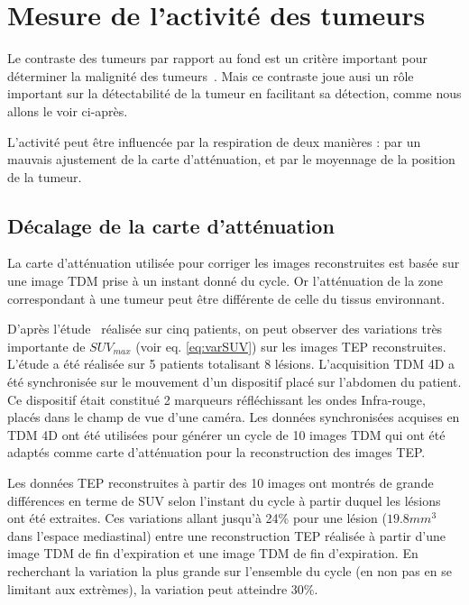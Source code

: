 \section{Mesure de l'activité des tumeurs}

Le contraste des tumeurs par rapport au fond est un critère important pour déterminer la malignité des tumeurs~\cite{dimitrakopoulou2002role, krak2005effects}. Mais ce contraste joue ausi un rôle important sur la détectabilité de la tumeur en facilitant sa détection, comme nous allons le voir ci-après.

L'activité peut être influencée par la respiration de deux manières : par un mauvais ajustement de la carte d'atténuation, et par le moyennage de la position de la tumeur.

\subsection{Décalage de la carte d'atténuation}

La carte d'atténuation utilisée pour corriger les images reconstruites est basée sur une image TDM prise à un instant donné du cycle. Or l'atténuation de la zone correspondant à une tumeur peut être différente de celle du tissus environnant.

D'après l'étude~\cite{erdi2004ct} réalisée sur cinq patients, on peut observer des variations très importante de $SUV_{max}$ (voir eq. \ref{eq:varSUV}) sur les images TEP reconstruites. L'étude a été réalisée sur 5 patients totalisant 8 lésions. L'acquisition TDM 4D a été synchronisée sur le mouvement d'un dispositif placé sur l'abdomen du patient. Ce dispositif était constitué 2 marqueurs réfléchissant les ondes Infra-rouge, placés dans le champ de vue d'une caméra. Les données synchronisées acquises en TDM 4D ont été utilisées pour générer un cycle de 10 images TDM qui ont été adaptés comme carte d'atténuation pour la reconstruction des images TEP.

Les données TEP reconstruites à partir des 10 images ont montrés de grande différences en terme de SUV selon l'instant du cycle à partir duquel les lésions ont été extraites.
Ces variations allant jusqu'à 24\% pour une lésion ($19.8 mm^3$ dans l'espace mediastinal) entre une reconstruction TEP réalisée à partir d'une image TDM de fin d'expiration et une image TDM de fin d'expiration. En recherchant la variation la plus grande sur l'ensemble du cycle (en non pas en se limitant aux extrèmes), la variation peut atteindre 30\%.

